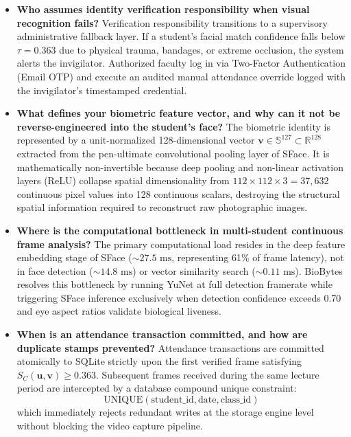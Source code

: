 \documentclass[12pt,a4paper,oneside]{report}
\begin{document}
\begin{itemize}
    \item \textbf{Who assumes identity verification responsibility when visual recognition fails?}
    Verification responsibility transitions to a supervisory administrative fallback layer. If a student's facial match confidence falls below $\tau = 0.363$ due to physical trauma, bandages, or extreme occlusion, the system alerts the invigilator. Authorized faculty log in via Two-Factor Authentication (Email OTP) and execute an audited manual attendance override logged with the invigilator's timestamped credential.

    \item \textbf{What defines your biometric feature vector, and why can it not be reverse-engineered into the student's face?}
    The biometric identity is represented by a unit-normalized 128-dimensional vector $\mathbf{v} \in \mathbb{S}^{127} \subset \mathbb{R}^{128}$ extracted from the pen-ultimate convolutional pooling layer of SFace. It is mathematically non-invertible because deep pooling and non-linear activation layers (ReLU) collapse spatial dimensionality from $112 \times 112 \times 3 = 37,632$ continuous pixel values into 128 continuous scalars, destroying the structural spatial information required to reconstruct raw photographic images.

    \item \textbf{Where is the computational bottleneck in multi-student continuous frame analysis?}
    The primary computational load resides in the deep feature embedding stage of SFace ($\sim 27.5\text{ ms}$, representing 61\% of frame latency), not in face detection ($\sim 14.8\text{ ms}$) or vector similarity search ($\sim 0.11\text{ ms}$). BioBytes resolves this bottleneck by running YuNet at full detection framerate while triggering SFace inference exclusively when detection confidence exceeds 0.70 and eye aspect ratios validate biological liveness.

    \item \textbf{When is an attendance transaction committed, and how are duplicate stamps prevented?}
    Attendance transactions are committed atomically to SQLite strictly upon the first verified frame satisfying $S_C(\mathbf{u}, \mathbf{v}) \geq 0.363$. Subsequent frames received during the same lecture period are intercepted by a database compound unique constraint:
    $$\text{UNIQUE}(\text{student\_id}, \text{date}, \text{class\_id})$$
    which immediately rejects redundant writes at the storage engine level without blocking the video capture pipeline.


\end{itemize}
\end{document}
